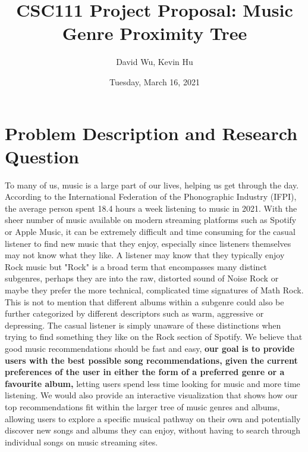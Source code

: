 \documentclass[fontsize=11pt]{article}
\title{CSC111 Project Proposal: Music Genre Proximity Tree}
\author{David Wu, Kevin Hu}
\date{Tuesday, March 16, 2021}
\begin{document}
\maketitle

\section*{Problem Description and Research Question}

To many of us, music is a large part of our lives, helping us get through the day. According to the International Federation of the Phonographic Industry (IFPI), the average person spent 18.4 hours a week listening to music in 2021. With the sheer number of music available on modern streaming platforms such as Spotify or Apple Music, it can be extremely difficult and time consuming for the casual listener to find new music that they enjoy, especially since listeners themselves may not know what they like. A listener may know that they typically enjoy Rock music but "Rock" is a broad term that encompasses many distinct subgenres, perhaps they are into the raw, distorted sound of Noise Rock or maybe they prefer the more technical, complicated time signatures of Math Rock. This is not to mention that different albums within a subgenre could also be further categorized by different descriptors such as warm, aggressive or depressing. The casual listener is simply unaware of these distinctions when trying to find something they like on the Rock section of Spotify. We believe that good music recommendations should be fast and easy, \textbf{our goal is to provide users with the best possible song recommendations, given the current preferences of the user in either the form of a preferred genre or a favourite album,} letting users spend less time looking for music and more time listening. We would also provide an interactive visualization that shows how our top recommendations fit within the larger tree of music genres and albums, allowing users to explore a specific musical pathway on their own and potentially discover new songs and albums they can enjoy, without having to search through individual songs on music streaming sites.
\end{document}
